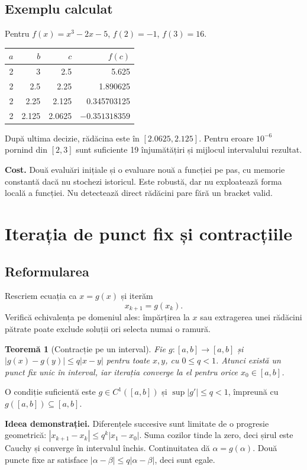 \documentclass[11pt,a4paper]{article}
\newtheorem{theorem}{Teoremă}[section]
\begin{document}
\subsection{Exemplu calculat}
Pentru $f(x)=x^3-2x-5$, $f(2)=-1$, $f(3)=16$.
\begin{center}\begin{tabular}{rrrr}\toprule
$a$ & $b$ & $c$ & $f(c)$\\\midrule
2 & 3 & 2.5 & 5.625\\
2 & 2.5 & 2.25 & 1.890625\\
2 & 2.25 & 2.125 & 0.345703125\\
2 & 2.125 & 2.0625 & $-0.351318359$\\\bottomrule
\end{tabular}\end{center}
După ultima decizie, rădăcina este în $[2.0625,2.125]$. Pentru eroare $10^{-6}$ pornind din $[2,3]$ sunt suficiente 19 înjumătățiri și mijlocul intervalului rezultat.

\textbf{Cost.} Două evaluări inițiale și o evaluare nouă a funcției pe pas, cu memorie constantă dacă nu stochezi istoricul. Este robustă, dar nu exploatează forma locală a funcției. Nu detectează direct rădăcini pare fără un bracket valid.

\section{Iterația de punct fix și contracțiile}
\subsection{Reformularea}
Rescriem ecuația ca $x=g(x)$ și iterăm
\[
x_{k+1}=g(x_k).
\]
Verifică echivalența pe domeniul ales: împărțirea la $x$ sau extragerea unei rădăcini pătrate poate exclude soluții ori selecta numai o ramură.

\begin{theorem}[Contracție pe un interval]
Fie $g:[a,b]\to[a,b]$ și $|g(x)-g(y)|\le q|x-y|$ pentru toate $x,y$, cu $0\le q<1$. Atunci există un punct fix unic în interval, iar iterația converge la el pentru orice $x_0\in[a,b]$.
\end{theorem}
O condiție suficientă este $g\in C^1([a,b])$ și $\sup|g'|\le q<1$, împreună cu $g([a,b])\subseteq[a,b]$.

\textbf{Ideea demonstrației.} Diferențele succesive sunt limitate de o progresie geometrică: $|x_{k+1}-x_k|\le q^k|x_1-x_0|$. Suma cozilor tinde la zero, deci șirul este Cauchy și converge în intervalul închis. Continuitatea dă $\alpha=g(\alpha)$. Două puncte fixe ar satisface $|\alpha-\beta|\le q|\alpha-\beta|$, deci sunt egale.
\end{document}
